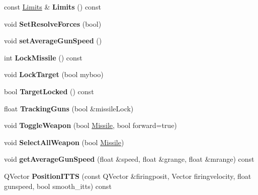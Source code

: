 \begin{DoxyCompactItemize}
\item 
const \hyperlink{classUnit_1_1Limits}{Limits} \& {\bfseries Limits} () const \hypertarget{classUnit_aada40d51b7d142bfa95f87dfb72625a9}{}\label{classUnit_aada40d51b7d142bfa95f87dfb72625a9}

\item 
void {\bfseries Set\+Resolve\+Forces} (bool)\hypertarget{classUnit_a4244dc359471354a75726a31563c8e63}{}\label{classUnit_a4244dc359471354a75726a31563c8e63}

\item 
void {\bfseries set\+Average\+Gun\+Speed} ()\hypertarget{classUnit_a7c0bdccc14f27fd54c810151a7f590f7}{}\label{classUnit_a7c0bdccc14f27fd54c810151a7f590f7}

\item 
int {\bfseries Lock\+Missile} () const \hypertarget{classUnit_ad8d5e53ac674bdc6ccae4a2cd2ef5ff8}{}\label{classUnit_ad8d5e53ac674bdc6ccae4a2cd2ef5ff8}

\item 
void {\bfseries Lock\+Target} (bool myboo)\hypertarget{classUnit_af711890dc331dfee9391eadf8283f240}{}\label{classUnit_af711890dc331dfee9391eadf8283f240}

\item 
bool {\bfseries Target\+Locked} () const \hypertarget{classUnit_ac0713a64170fa2b4ca235cc2fbd9e828}{}\label{classUnit_ac0713a64170fa2b4ca235cc2fbd9e828}

\item 
float {\bfseries Tracking\+Guns} (bool \&missile\+Lock)\hypertarget{classUnit_a626708cdcedbf9a31278576aea3ad044}{}\label{classUnit_a626708cdcedbf9a31278576aea3ad044}

\item 
void {\bfseries Toggle\+Weapon} (bool \hyperlink{classMissile}{Missile}, bool forward=true)\hypertarget{classUnit_a15280dbc97ee7488651e2ad681ea93e4}{}\label{classUnit_a15280dbc97ee7488651e2ad681ea93e4}

\item 
void {\bfseries Select\+All\+Weapon} (bool \hyperlink{classMissile}{Missile})\hypertarget{classUnit_af6fcb4d2d626282df9c06dddd0d24366}{}\label{classUnit_af6fcb4d2d626282df9c06dddd0d24366}

\item 
void {\bfseries get\+Average\+Gun\+Speed} (float \&speed, float \&grange, float \&mrange) const \hypertarget{classUnit_a0c9c06685ea3e8f872409cd26e4df5d3}{}\label{classUnit_a0c9c06685ea3e8f872409cd26e4df5d3}

\item 
Q\+Vector {\bfseries Position\+I\+T\+TS} (const Q\+Vector \&firingposit, Vector firingvelocity, float gunspeed, bool smooth\+\_\+itts) const \hypertarget{classUnit_a01dce04e3f1a9d893568fe895770d8fa}{}\label{classUnit_a01dce04e3f1a9d893568fe895770d8fa}


\end{DoxyCompactItemize}
